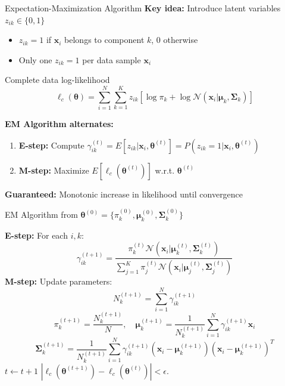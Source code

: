\documentclass{beamer}
\newcommand{\x}{\mathbf{x}}
\newcommand{\bmu}{\boldsymbol{\mu}}
\newcommand{\bSigma}{\boldsymbol{\Sigma}}
\newcommand{\btheta}{\boldsymbol{\theta}}
\begin{document}
\begin{frame}{Expectation-Maximization Algorithm}
\textbf{Key idea:} Introduce latent variables $z_{ik} \in \{0,1\}$
\begin{itemize}
\item $z_{ik} = 1$ if $\x_i$ belongs to component $k$, 0 otherwise
\item Only one $z_{ik} = 1$ per data sample $\x_i$
\end{itemize}

\pause 

\begin{block}{Complete data log-likelihood}
$$\ell_c(\btheta) = \sum_{i=1}^N \sum_{k=1}^K z_{ik}[\log \pi_k + \log \mathcal{N}(\x_i|\bmu_k, \bSigma_k)]$$
\end{block}

\pause

\textbf{EM Algorithm alternates:}
\begin{enumerate}
\item \textbf{E-step:} Compute $\gamma_{ik}^{(t)} = E[z_{ik}|\x_i, \btheta^{(t)}] = P(z_{ik}=1|\x_i, \btheta^{(t)})$
\item \textbf{M-step:} Maximize $E[\ell_c(\btheta^{(t)})]$ w.r.t. $\btheta^{(t)}$
\end{enumerate}

\pause

\textbf{Guaranteed:} Monotonic increase in likelihood until convergence
\end{frame}

\begin{frame}{EM Algorithm from $\btheta^{(0)} = \{\pi_k^{(0)}, \bmu_k^{(0)}, \bSigma_k^{(0)}\}$}
\begin{algorithmic}[1]
\REPEAT
\STATE \textbf{E-step:} For each $i, k$:
$$\gamma_{ik}^{(t+1)} = \frac{\pi_k^{(t)} \mathcal{N}(\x_i|\bmu_k^{(t)}, \bSigma_k^{(t)})}{\sum_{j=1}^K \pi_j^{(t)} \mathcal{N}(\x_i|\bmu_j^{(t)}, \bSigma_j^{(t)})}$$
\STATE \textbf{M-step:} Update parameters:
$$N_k^{(t+1)} = \sum_{i=1}^N \gamma_{ik}^{(t+1)}$$
$$ \pi_k^{(t+1)} = \frac{N_k^{(t+1)}}{N}, \quad \bmu_k^{(t+1)} = \frac{1}{N_k^{(t+1)}} \sum_{i=1}^N \gamma_{ik}^{(t+1)} \x_i$$
$$\bSigma_k^{(t+1)} = \frac{1}{N_k^{(t+1)}} \sum_{i=1}^N \gamma_{ik}^{(t+1)} (\x_i - \bmu_k^{(t+1)})(\x_i - \bmu_k^{(t+1)})^T$$
\STATE $t \leftarrow t + 1$
\UNTIL $|\ell_c(\btheta^{(t+1)})-\ell_c(\btheta^{(t)})| < \epsilon$.
\end{algorithmic}
\end{frame}
\end{document}
